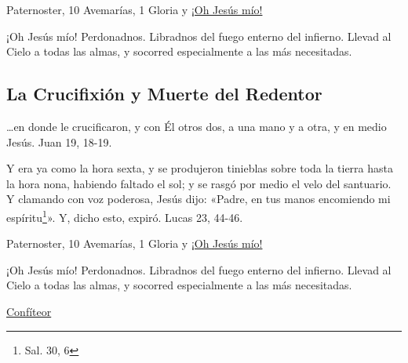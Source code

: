\documentclass[a4paper,11pt, oneside]{report}
\begin{document}
{{       Paternoster, 10 Avemarías, 1 Gloria y \hyperlink{finalCruz}{¡Oh Jesús mío!}
      
      \medskip
      \hypertarget{finalCruz}{¡Oh Jesús mío! Perdonadnos. Libradnos del fuego enterno del infierno. Llevad al Cielo a todas las almas, y socorred especialmente a las más 
      necesitadas.}
    }
  
  \subsection*{La Crucifixión y Muerte del Redentor}
    {
      {\ldots}en donde le crucificaron, y con Él otros dos, a una mano y a otra, y en medio Jesús. Juan 19, 18-19.

      \smallskip
      Y era ya como la hora sexta, y se produjeron tinieblas sobre toda la tierra hasta la hora nona, habiendo faltado el sol; y se rasgó por medio 
      el velo del santuario. Y clamando con voz poderosa, Jesús dijo: «Padre, en tus manos encomiendo mi espíritu\footnote{Sal. 30, 6}». 
      Y, dicho esto, expiró. Lucas 23, 44-46.
      
       Paternoster, 10 Avemarías, 1 Gloria y \hyperlink{finalMuerte}{¡Oh Jesús mío!}
      
      \medskip
      \hypertarget{finalMuerte}{¡Oh Jesús mío! Perdonadnos. Libradnos del fuego enterno del infierno. Llevad al Cielo a todas las almas, y socorred especialmente a las más 
      necesitadas.}
    }

  \par\bigskip
  \hyperlink{sec:confiteor}{Confíteor}
}
        
\end{document}
